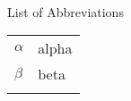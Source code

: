
\renewcommand{\baselinestretch}{1}
\small\normalsize
\hbox{\ }

\vspace{.5in}


\begin{center}
\large{List of Abbreviations}
\end{center} 

\vspace{3pt}

\begin{tabular}{ll}
$\alpha$ & alpha \\
$\beta$  & beta \\
&  \\ 

\end{tabular}
